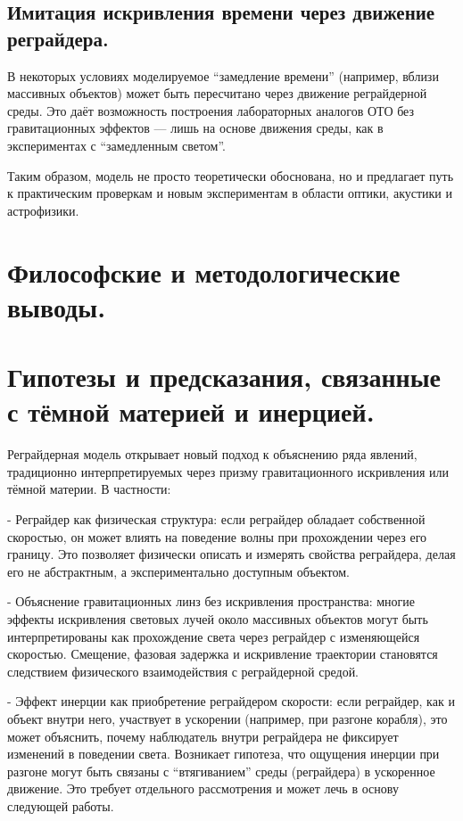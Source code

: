\documentclass[12pt]{article}
\begin{document}
\subsection{Имитация искривления времени через движение реграйдера.}
В некоторых условиях моделируемое “замедление времени” (например, вблизи массивных объектов) может быть пересчитано через движение реграйдерной среды. Это даёт возможность построения лабораторных аналогов ОТО без гравитационных эффектов — лишь на основе движения среды, как в экспериментах с “замедленным светом”.

Таким образом, модель не просто теоретически обоснована, но и предлагает путь к практическим проверкам и новым экспериментам в области оптики, акустики и астрофизики.

\section*{Философские и методологические выводы.}
\section*{Гипотезы и предсказания, связанные с тёмной материей и инерцией.}


Реграйдерная модель открывает новый подход к объяснению ряда явлений, традиционно интерпретируемых через призму гравитационного искривления или тёмной материи. В частности:

- Реграйдер как физическая структура: если реграйдер обладает собственной скоростью, он может влиять на поведение волны при прохождении через его границу. Это позволяет физически описать и измерять свойства реграйдера, делая его не абстрактным, а экспериментально доступным объектом.

- Объяснение гравитационных линз без искривления пространства: многие эффекты искривления световых лучей около массивных объектов могут быть интерпретированы как прохождение света через реграйдер с изменяющейся скоростью. Смещение, фазовая задержка и искривление траектории становятся следствием физического взаимодействия с реграйдерной средой.

- Эффект инерции как приобретение реграйдером скорости: если реграйдер, как и объект внутри него, участвует в ускорении (например, при разгоне корабля), это может объяснить, почему наблюдатель внутри реграйдера не фиксирует изменений в поведении света. Возникает гипотеза, что ощущения инерции при разгоне могут быть связаны с “втягиванием” среды (реграйдера) в ускоренное движение. Это требует отдельного рассмотрения и может лечь в основу следующей работы.
\end{document}
